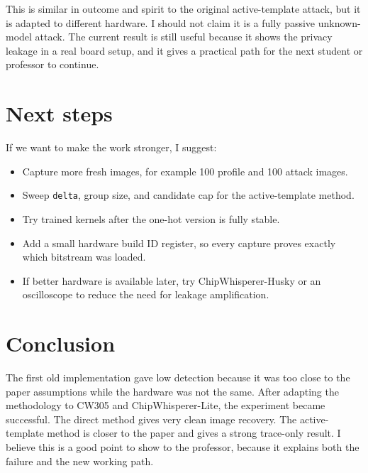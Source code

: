 \documentclass[11pt]{article}
\begin{document}
This is similar in outcome and spirit to the original active-template attack,
but it is adapted to different hardware. I should not claim it is a fully passive
unknown-model attack. The current result is still useful because it shows the
privacy leakage in a real board setup, and it gives a practical path for the next
student or professor to continue.

\section*{Next steps}

If we want to make the work stronger, I suggest:

\begin{itemize}
  \item Capture more fresh images, for example 100 profile and 100 attack images.
  \item Sweep \texttt{delta}, group size, and candidate cap for the active-template
  method.
  \item Try trained kernels after the one-hot version is fully stable.
  \item Add a small hardware build ID register, so every capture proves exactly
  which bitstream was loaded.
  \item If better hardware is available later, try ChipWhisperer-Husky or an
  oscilloscope to reduce the need for leakage amplification.
\end{itemize}

\section*{Conclusion}

The first old implementation gave low detection because it was too close to the
paper assumptions while the hardware was not the same. After adapting the
methodology to CW305 and ChipWhisperer-Lite, the experiment became successful.
The direct method gives very clean image recovery. The active-template method is
closer to the paper and gives a strong trace-only result. I believe this is a
good point to show to the professor, because it explains both the failure and
the new working path.
\end{document}
